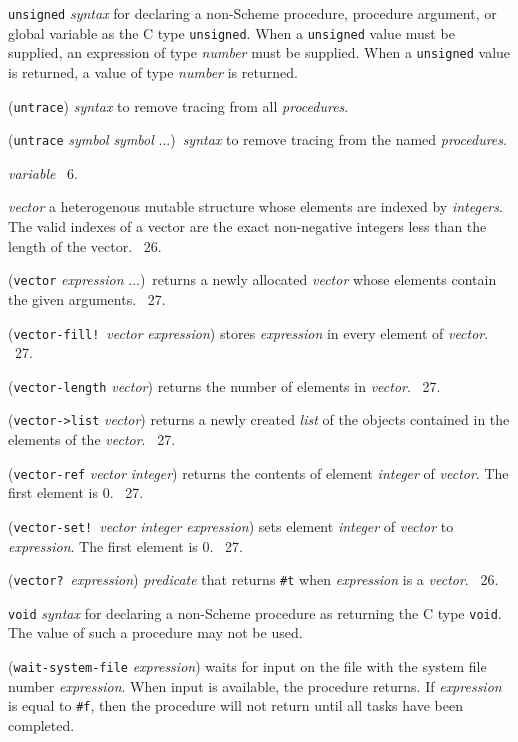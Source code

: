\documentclass[10pt,twocolumn]{article}
\begin{document}
\texttt{unsigned} \emph{syntax} for declaring a non-Scheme procedure,
procedure argument, or global variable as the C type
\texttt{unsigned}.  When a \texttt{unsigned} value must be supplied,
an expression of type \emph{number} must be supplied.  When a
\texttt{unsigned} value is returned, a value of type \emph{number} is
returned.

(\texttt{untrace}) \emph{syntax} to remove tracing from all
\emph{procedures}.

(\texttt{untrace} \emph{symbol} \emph{symbol} ...)\ \emph{syntax} to
remove tracing from the named \emph{procedures}.

\emph{variable} \RRRRRS~6.

\emph{vector} a heterogenous mutable structure whose elements are
indexed by \emph{integers}.  The valid indexes of a vector are the
exact non-negative integers less than the length of the
vector. \RRRRRS~26.

(\texttt{vector} \emph{expression} ...)\ returns a newly allocated
\emph{vector} whose elements contain the given arguments.  \RRRRRS~27.

(\texttt{vector-fill!}\ \emph{vector} \emph{expression}) stores
\emph{expression} in every element of \emph{vector}.  \RRRRRS~27.

(\texttt{vector-length} \emph{vector}) returns the number of elements
in \emph{vector}.  \RRRRRS~27.

(\texttt{vector->list} \emph{vector}) returns a newly created
\emph{list} of the objects contained in the elements of the
\emph{vector}.  \RRRRRS~27.

(\texttt{vector-ref} \emph{vector} \emph{integer}) returns the
contents of element \emph{integer} of \emph{vector}.  The first
element is 0.  \RRRRRS~27.

(\texttt{vector-set!}\ \emph{vector} \emph{integer} \emph{expression})
sets element \emph{integer} of \emph{vector} to \emph{expression}.
The first element is 0.  \RRRRRS~27.

(\texttt{vector?}\ \emph{expression}) \emph{predicate} that returns
\texttt{\#t} when \emph{expression} is a \emph{vector}.  \RRRRRS~26.

\texttt{void} \emph{syntax} for declaring a non-Scheme procedure as
returning the C type \texttt{void}.  The value of such a procedure may
not be used.

(\texttt{wait-system-file} \emph{expression}) waits for input on the
file with the system file number \emph{expression}.  When input is
available, the procedure returns.  If \emph{expression} is equal to
\texttt{\#f}, then the procedure will not return until all tasks have
been completed.
\end{document}
